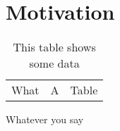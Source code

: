 \chapter{Motivation}

\begin{table}[hbt]
  \centering
  \begin{tabular}{ccc}
    What & A & Table
  \end{tabular}
  \caption{This table shows some data}
\label{tab:mytable}
\end{table}
\clearpage

Whatever you say
